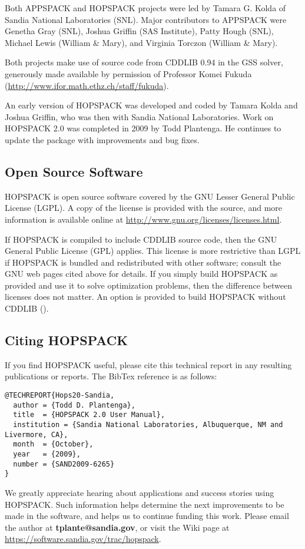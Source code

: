 Both APPSPACK and HOPSPACK projects were led by Tamara G. Kolda of Sandia
National Laboratories (SNL).  Major contributors to APPSPACK were
Genetha Gray (SNL), Joshua Griffin (SAS Institute), Patty Hough (SNL),
Michael Lewis (William \& Mary), and Virginia Torczon (William \& Mary).

Both projects make use of source code from CDDLIB 0.94 in the GSS solver,
generously made available by permission of Professor Komei Fukuda
(\href{http://www.ifor.math.ethz.ch/staff/fukuda}
      {http://www.ifor.math.ethz.ch/staff/fukuda}).

An early version of HOPSPACK was developed and coded by Tamara Kolda and
Joshua Griffin, who was then with Sandia National Laboratories.
Work on HOPSPACK 2.0 was completed in 2009 by Todd Plantenga.
He continues to update the package with improvements and bug fixes.


\subsection{Open Source Software}
\label{subintro:licenses}

HOPSPACK is open source software covered by the GNU Lesser General Public
License (LGPL).  A copy of the license is provided with the source, and more
information is available online at
\href{http://www.gnu.org/licenses/licenses.html}
     {http://www.gnu.org/licenses/licenses.html}.

If HOPSPACK is compiled to include CDDLIB source code, then the GNU General
Public License (GPL) applies.  This license is more restrictive than LGPL
if HOPSPACK is bundled and redistributed with other software; consult the GNU
web pages cited above for details.
If you simply build HOPSPACK as provided and use it to solve optimization
problems, then the difference between licenses does not matter.  An option
is provided to build HOPSPACK without CDDLIB ().


\subsection{Citing HOPSPACK}

If you find HOPSPACK useful, please cite this technical report in any
resulting publications or reports.  The BibTex reference is as follows:
\begin{verbatim}
@TECHREPORT{Hops20-Sandia,
  author = {Todd D. Plantenga},
  title  = {HOPSPACK 2.0 User Manual},
  institution = {Sandia National Laboratories, Albuquerque, NM and Livermore, CA},
  month  = {October},
  year   = {2009},
  number = {SAND2009-6265}
}
\end{verbatim}

We greatly appreciate hearing about applications and success stories
using HOPSPACK.  Such information helps determine the next improvements to
be made in the software, and helps us to continue funding this work.
Please email the author at {\bf tplante@sandia.gov},
or visit the Wiki page at
\href{https://software.sandia.gov/trac/hopspack}
     {https://software.sandia.gov/trac/hopspack}.
